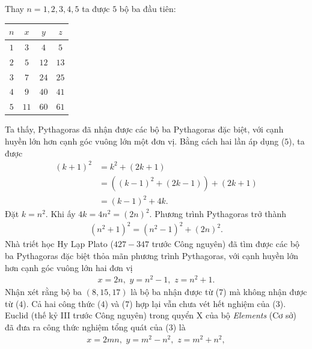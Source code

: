 \begin{multicols}{2}
	\vskip 0.1cm
	Thay  $n = 1,2,3,4,5$ ta được $5$ bộ ba đầu tiên:
	\begin{table}[H]
		\vspace*{-5pt}
		\centering
		\renewcommand{\arraystretch}{1.1}
		\begin{tabular}{|c|c|c|c|}
			\hline
			$n$ & $x$ & $y$ & $z$ \\
			\hline
			$1$	&$3$&	$4$&	$5$\\
			\hline
			$2$&	$5$&	$12$&	$13$\\
			\hline
			$3$&	$7$&	$24$&	$25$\\	
			\hline
			$4$&	$9$&	$40$&	$41$\\
			\hline
			$5$&	$11$&	$60$&	$61$\\
			\hline
		\end{tabular}
	\end{table}	
	Ta thấy, Pythagoras đã nhận được các bộ ba Pythagoras đặc biệt, với cạnh huyền lớn hơn cạnh góc vuông lớn một đơn vị.
	\vskip 0.1cm
	Bằng cách hai lần áp dụng ($5$), ta được
	\begin{align*}
		{\left( {k + 1} \right)^2} &= {k^2} + (2k + 1)\\
		&= \left( {{{\left( {k \!-\! 1} \right)}^2} \!+\! \left( {2k \!-\! 1} \right)} \right) \!+\! (2k \!+\! 1) \\
		&= {\left( {k - 1} \right)^2} + 4k.
	\end{align*}
	Đặt $k = n^2$.  Khi ấy  $4k = 4{n^2} = {\left( {2n} \right)^2}$.
	\vskip 0.05cm
	Phương trình Pythagoras trở thành
	\begin{align*}
		{\left( {{n^2} + 1} \right)^2} = {\left( {{n^2} - 1} \right)^2} + {\left( {2n} \right)^2}.
	\end{align*}
	Nhà triết học Hy Lạp Plato ($427-347$ trước Công nguyên) đã tìm được các bộ ba Pythagoras đặc biệt thỏa mãn phương trình Pythagoras, với cạnh huyền lớn hơn cạnh góc vuông lớn hai đơn vị
	\begin{align*}
		x = 2n,\,\, y = {n^2} - 1,\,\, z = {n^2} + 1. \tag{$7$}
	\end{align*}
	Nhận xét rằng bộ ba $(8, 15, 17)$ là bộ ba nhận được từ ($7$) mà không nhận được từ ($4$).
	\vskip 0.1cm 
	Cả hai công thức ($4$) và ($7$) hợp lại vẫn chưa vét hết nghiệm của ($3$). Euclid (thế kỷ III trước Công nguyên) trong quyển X của bộ \textit{Elements} (Cơ sở) đã đưa ra công thức nghiệm tổng quát của ($3$) là
	\begin{align*}
		x = 2mn,\,\, y = {m^2} - {n^2}, \,\, z = {m^2} + {n^2}, \tag{$8$}
	\end{align*}

\end{multicols}
